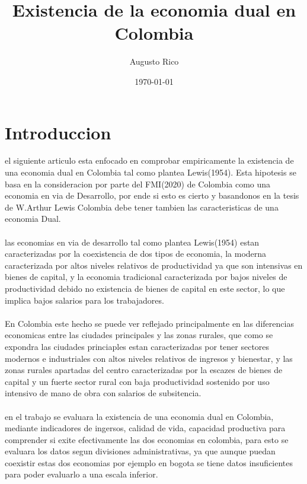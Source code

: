 \documentclass[12pt,letterpaper]{book}
\title{Existencia de la economia dual en Colombia}
\author{Augusto Rico}
\date{\today}
\begin{document}
\maketitle
\section{Introduccion}

\begin{flushleft}   


el siguiente articulo esta enfocado en comprobar empiricamente la existencia de una economia dual en Colombia tal como plantea Lewis(1954).
Esta hipotesis se basa en la consideracion por parte del FMI(2020) de Colombia como una economia en via de Desarrollo, por ende si esto es cierto 
y basandonos en la tesis de W.Arthur Lewis Colombia debe tener tambien las caracteristicas de una economia Dual.\\
~\\
las economias en via de desarrollo tal como plantea Lewis(1954) estan caracterizadas por la coexistencia de dos tipos de economia, la moderna caracterizada
por altos niveles relativos de productividad ya que son intensivas en bienes de capital, y la economia tradicional caracterizada por bajos niveles de productividad
debido no existencia de bienes de capital en este sector, lo que implica bajos salarios para los trabajadores.\\
~\\
En Colombia este hecho se puede ver reflejado principalmente en las diferencias economicas entre las ciudades principales y las zonas rurales, que como se expondra
las ciudades princiaples estan caracterizadas por tener sectores modernos e industriales con altos niveles relativos de ingresos y bienestar, y las zonas rurales
apartadas del centro caracterizadas por la escazes de bienes de capital y un fuerte sector rural con baja productividad sostenido por uso intensivo de mano de obra con salarios de subsitencia.\\
~\\
en el trabajo se evaluara la existencia de una economia dual en Colombia, mediante indicadores de ingersos, calidad de vida, capacidad productiva para comprender si
exite efectivamente las dos economias en colombia, para esto se evaluara los datos segun divisiones administrativas, ya que aunque puedan coexistir estas dos economias por ejemplo en bogota
se tiene datos insuficientes para poder evaluarlo a una escala inferior.\\

\end{flushleft}
\end{document}
